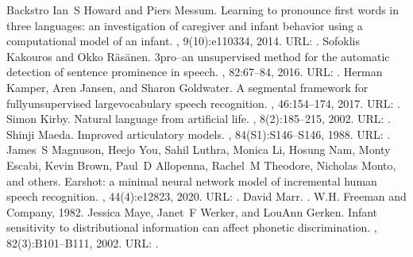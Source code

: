 \documentclass[letterpaper,10pt,english]{jupyterBook}
\begin{document}
\begin{sphinxthebibliography}{Backstro}
\sphinxAtStartPar
Ian S Howard and Piers Messum. Learning to pronounce first words in three languages: an investigation of caregiver and infant behavior using a computational model of an infant. , 9(10):e110334, 2014. URL: .
\sphinxAtStartPar
Sofoklis Kakouros and Okko Räsänen. 3pro–an unsupervised method for the automatic detection of sentence prominence in speech. , 82:67–84, 2016. URL: .
\sphinxAtStartPar
Herman Kamper, Aren Jansen, and Sharon Goldwater. A segmental framework for fully\sphinxhyphen{}unsupervised large\sphinxhyphen{}vocabulary speech recognition. , 46:154–174, 2017. URL: .
\sphinxAtStartPar
Simon Kirby. Natural language from artificial life. , 8(2):185–215, 2002. URL: .
\sphinxAtStartPar
Shinji Maeda. Improved articulatory models. , 84(S1):S146–S146, 1988. URL: .
\sphinxAtStartPar
James S Magnuson, Heejo You, Sahil Luthra, Monica Li, Hosung Nam, Monty Escabi, Kevin Brown, Paul D Allopenna, Rachel M Theodore, Nicholas Monto, and others. Earshot: a minimal neural network model of incremental human speech recognition. , 44(4):e12823, 2020. URL: .
\sphinxAtStartPar
David Marr. . W.H. Freeman and Company, 1982.
\sphinxAtStartPar
Jessica Maye, Janet F Werker, and LouAnn Gerken. Infant sensitivity to distributional information can affect phonetic discrimination. , 82(3):B101–B111, 2002. URL: .

\end{sphinxthebibliography}
\end{document}
